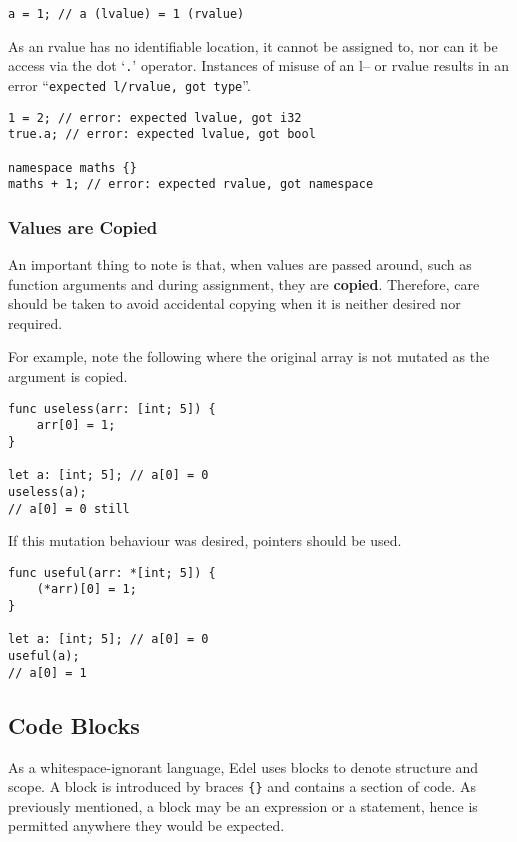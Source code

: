 \begin{lstlisting}[language=CustomLang]
a = 1; // a (lvalue) = 1 (rvalue)
\end{lstlisting}

As an rvalue has no identifiable location, it cannot be assigned to, nor can it be access via the dot `\texttt{.}' operator.
Instances of misuse of an l-- or rvalue results in an error ``\texttt{expected l/rvalue, got type}''.

\begin{lstlisting}[language=CustomLang]
1 = 2; // error: expected lvalue, got i32
true.a; // error: expected lvalue, got bool

namespace maths {}
maths + 1; // error: expected rvalue, got namespace
\end{lstlisting}

\subsubsection{Values are Copied}

An important thing to note is that, when values are passed around, such as function arguments and during assignment, they are \textbf{copied}.
Therefore, care should be taken to avoid accidental copying when it is neither desired nor required.

For example, note the following where the original array is not mutated as the argument is copied.

\begin{lstlisting}[language=CustomLang]
func useless(arr: [int; 5]) {
    arr[0] = 1;
}

let a: [int; 5]; // a[0] = 0
useless(a);
// a[0] = 0 still
\end{lstlisting}

If this mutation behaviour was desired, pointers should be used.

\begin{lstlisting}[language=CustomLang]
func useful(arr: *[int; 5]) {
    (*arr)[0] = 1;
}

let a: [int; 5]; // a[0] = 0
useful(a);
// a[0] = 1
\end{lstlisting}

\subsection{Code Blocks}\label{subsec:code-blocks}

As a whitespace-ignorant language, Edel uses blocks to denote structure and scope.
A block is introduced by braces \texttt{\{\}} and contains a section of code.
As previously mentioned, a block may be an expression or a statement, hence is permitted anywhere they would be expected.

